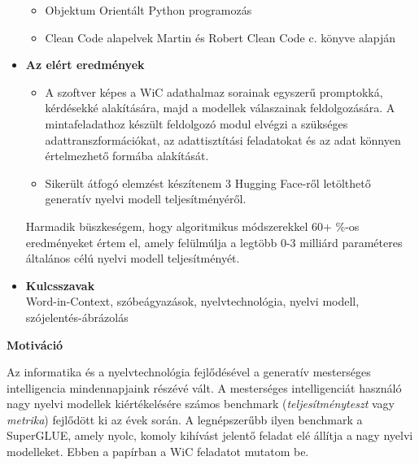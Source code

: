 \documentclass[12pt]{report}
\theoremstyle{definition}
\begin{document}
\begin{itemize}
\begin{itemize}
        \item Objektum Orientált Python programozás
        \item Clean Code alapelvek Martin és Robert Clean Code c. könyve \cite{martin2008cleancode} alapján

      \end{itemize}
\item \textbf{Az elért eredmények}
        \\
        \begin{itemize}
            \item A szoftver képes a WiC adathalmaz sorainak egyszerű promptokká, kérdésekké alakítására, majd a modellek válaszainak feldolgozására.
        A mintafeladathoz készült feldolgozó modul elvégzi a szükséges adattranszformációkat, az adattisztítási feladatokat és az adat könnyen értelmezhető formába alakítását.

     \item Sikerült átfogó elemzést készítenem 3 Hugging Face-ről
      letölthető generatív nyelvi modell teljesítményéről.
        \end{itemize}


      Harmadik büszkeségem, hogy algoritmikus módszerekkel 60+ \%-os eredményeket értem el, amely felülmúlja a legtöbb 0-3 milliárd paraméteres általános célú nyelvi modell teljesítményét.

\item \textbf{Kulcsszavak}
        \\
       Word-in-Context, szóbeágyazások, nyelvtechnológia, nyelvi modell, szójelentés-ábrázolás
\end{itemize}

\tableofcontents

\clearpage

{\Large\bf Motiváció }

Az informatika és a nyelvtechnológia fejlődésével a generatív mesterséges intelligencia mindennapjaink részévé vált. A mesterséges intelligenciát használó nagy nyelvi modellek kiértékelésére számos benchmark (\textit{teljesítményteszt} vagy \textit{metrika}) fejlődött ki az évek során. A legnépszerűbb ilyen benchmark a
SuperGLUE, amely nyolc, komoly kihívást jelentő feladat elé állítja a nagy nyelvi modelleket. Ebben a papírban a WiC feladatot mutatom be.
\end{document}
